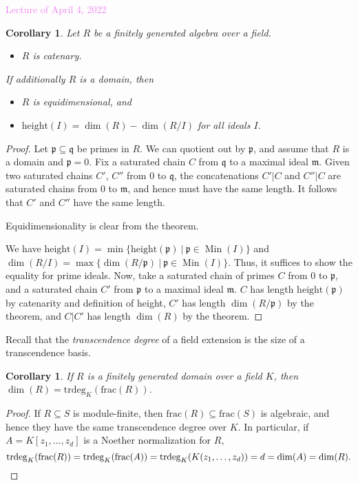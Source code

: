 \documentclass{amsart}[12pt]
\def\htt{\mathrm{height}}
\def\Min{\operatorname{Min}}
\newcommand{\Apr}[1]{\textcolor{violet}{Lecture of April #1, 2022}}
\newcommand{\p}{{\mathfrak p}}
\newcommand{\m}{{\mathfrak m}}
\newcommand{\q}{{\mathfrak q}}
\newcommand{\DEF}[1]{\emph{#1}\index{#1}}
\numberwithin{equation}{section}
\theoremstyle{plain} %
\newtheorem{corollary}[equation]{Corollary}
\theoremstyle{definition}
\theoremstyle{remark}
\begin{document}
\Apr{4}

\begin{corollary}
	Let $R$ be a finitely generated algebra over a field.
	\begin{itemize}
		\item $R$ is catenary.
\end{itemize}
If additionally $R$ is a domain, then
	\begin{itemize}
		\item $R$ is equidimensional, and
		\item $\htt(I)=\dim(R)-\dim(R/I)$ for all ideals $I$.
	\end{itemize}
\end{corollary}
\begin{proof}
	Let $\p\subseteq \q$ be primes in $R$. We can quotient out by $\p$, and assume that $R$ is a domain and $\p=0$. Fix a saturated chain $C$ from $\q$ to a maximal ideal $\m$. Given two saturated chains $C'$, $C''$ from $0$ to $\q$, the concatenations $C'|C$ and $C''|C$ are saturated chains from $0$ to $\m$, and hence must have the same length. It follows that $C'$ and $C''$ have the same length.
	
	Equidimensionality is clear from the theorem.
	
	We have $\htt(I)=\min\{\htt(\p) \ | \ \p\in \Min(I)\}$ and $\dim(R/I)=\max\{\dim(R/\p) \ | \ \p\in \Min(I)\}$. Thus, it suffices to show the equality for prime ideals. Now, take a saturated chain of primes $C$ from $0$ to $\p$, and a saturated chain $C'$ from $\p$ to a maximal ideal $\m$. $C$ has length $\htt(\p)$ by catenarity and definition of height, $C'$ has length $\dim(R/\p)$ by the theorem, and $C|C'$ has length $\dim(R)$ by the theorem.
\end{proof}


Recall that the \DEF{transcendence degree} of a field extension is the size of a transcendence basis.

\begin{corollary}
	If $R$ is a finitely generated domain over a field $K$, then $\dim(R) = \mathrm{trdeg}_K(\mathrm{frac}(R))$.
\end{corollary}
\begin{proof}
	If $R\subseteq S$ is module-finite, then $\mathrm{frac}(R)\subseteq \mathrm{frac}(S)$ is algebraic, and hence they have the same transcendence degree over $K$. In particular, if $A=K[z_1,\dots,z_d]$ is a Noether normalization for $R$, 
	\[\mathrm{trdeg}_K(\mathrm{frac}(R))= \mathrm{trdeg}_K(\mathrm{frac}(A)) = \mathrm{trdeg}_K(K(z_1,\dots,z_d)) = d = \dim(A) = \dim(R).\qedhere\]
\end{proof}
\end{document}
